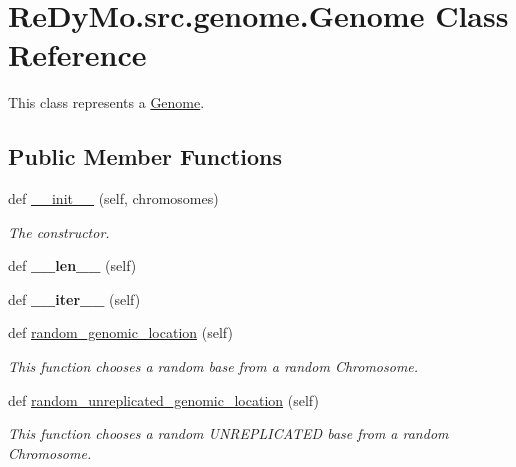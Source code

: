 \hypertarget{classReDyMo_1_1src_1_1genome_1_1Genome}{}\section{Re\+Dy\+Mo.\+src.\+genome.\+Genome Class Reference}
\label{classReDyMo_1_1src_1_1genome_1_1Genome}


This class represents a \mbox{\hyperlink{classReDyMo_1_1src_1_1genome_1_1Genome}{Genome}}.  


\subsection*{Public Member Functions}
\begin{DoxyCompactItemize}
\item 
\mbox{\label{classReDyMo_1_1src_1_1genome_1_1Genome_a2b10f0f1f2fab2f4247abcb2cb778f3c}} 
def \mbox{\hyperlink{classReDyMo_1_1src_1_1genome_1_1Genome_a2b10f0f1f2fab2f4247abcb2cb778f3c}{\+\_\+\+\_\+init\+\_\+\+\_\+}} (self, chromosomes)
\begin{DoxyCompactList}\small\item\em The constructor. \end{DoxyCompactList}\item 
\mbox{\label{classReDyMo_1_1src_1_1genome_1_1Genome_a740e2b6724ec98af5c42c31575816815}} 
def {\bfseries \+\_\+\+\_\+len\+\_\+\+\_\+} (self)
\item 
\mbox{\label{classReDyMo_1_1src_1_1genome_1_1Genome_a7e9435861195e29ecb2130430ec909ef}} 
def {\bfseries \+\_\+\+\_\+iter\+\_\+\+\_\+} (self)
\item 
def \mbox{\hyperlink{classReDyMo_1_1src_1_1genome_1_1Genome_a52ff5976c29d7f3308634d1806f0e6e5}{random\+\_\+genomic\+\_\+location}} (self)
\begin{DoxyCompactList}\small\item\em This function chooses a random base from a random Chromosome. \end{DoxyCompactList}\item 
def \mbox{\hyperlink{classReDyMo_1_1src_1_1genome_1_1Genome_a5ccf7050477245b02282b76b2cf72030}{random\+\_\+unreplicated\+\_\+genomic\+\_\+location}} (self)
\begin{DoxyCompactList}\small\item\em This function chooses a random U\+N\+R\+E\+P\+L\+I\+C\+A\+T\+ED base from a random Chromosome. \end{DoxyCompactList}\item 

\end{DoxyCompactItemize}
